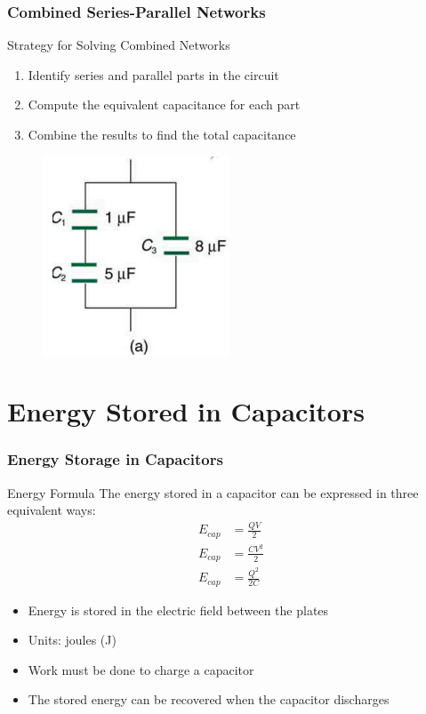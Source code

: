 \documentclass{beamer}
\begin{document}
\begin{frame}
    \frametitle{Combined Series-Parallel Networks}
    
    \begin{block}{Strategy for Solving Combined Networks}
        \begin{enumerate}
            \item Identify series and parallel parts in the circuit
            \item Compute the equivalent capacitance for each part
            \item Combine the results to find the total capacitance
        \end{enumerate}
    \end{block}
    
    \begin{center}
 \begin{figure}
        \centering
        \includegraphics[width=0.3\linewidth]{seriesparralcap.png}
    \end{figure}
    
        
    \end{center}
\end{frame}

\section{Energy Stored in Capacitors}

\begin{frame}
    \frametitle{Energy Storage in Capacitors}
    
    \begin{block}{Energy Formula}
        The energy stored in a capacitor can be expressed in three equivalent ways:
        \begin{align}
            E_{cap} &= \frac{QV}{2} \\
            E_{cap} &= \frac{CV^2}{2} \\
            E_{cap} &= \frac{Q^2}{2C}
        \end{align}
    \end{block}
    
    \begin{itemize}
        \item Energy is stored in the electric field between the plates
        \item Units: joules (J)
        \item Work must be done to charge a capacitor
        \item The stored energy can be recovered when the capacitor discharges
    \end{itemize}
\end{frame}
\end{document}
